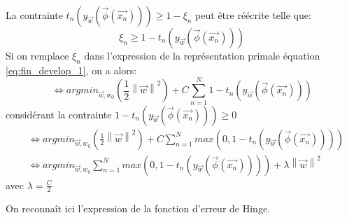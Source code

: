 La contrainte $t_n\left(y_{\overrightarrow{w}}(\overrightarrow{\phi}(\overrightarrow{x_n}))\right) \geqslant 1 - \xi_n$ peut être réécrite telle que:
$$
\xi_n \geqslant 1 - t_n\left(y_{\overrightarrow{w}}(\overrightarrow{\phi}(\overrightarrow{x_n}))\right)
$$
Si on remplace $\xi_n$ dans l'expression de la représentation primale équation \ref{eq:fin_develop_1}, on a alors:
\begin{equation}
	\iff argmin_{\overrightarrow{w}, w_0} \left(\frac{1}{2} \left\lVert\overrightarrow{w}\right\rVert^2 \right) + C \sum_{n=1}^N 1 - t_n\left(y_{\overrightarrow{w}}(\overrightarrow{\phi}(\overrightarrow{x_n}))\right)
\end{equation}
considérant la contrainte $1 - t_n\left(y_{\overrightarrow{w}}(\overrightarrow{\phi}(\overrightarrow{x_n}))\right) \geqslant 0$
\begin{equation}
\begin{split}
	&\iff argmin_{\overrightarrow{w}, w_0} \left(\frac{1}{2} \left\lVert\overrightarrow{w}\right\rVert^2 \right) + C \sum_{n=1}^N max\left(0, 1 - t_n\left(y_{\overrightarrow{w}}(\overrightarrow{\phi}(\overrightarrow{x_n}))\right)\right) \\
	&\iff argmin_{\overrightarrow{w}, w_0} \sum_{n=1}^N max\left(0, 1 - t_n\left(y_{\overrightarrow{w}}(\overrightarrow{\phi}(\overrightarrow{x_n}))\right)\right) + \lambda  \left\lVert\overrightarrow{w}\right\rVert^2
\end{split}
\end{equation}
avec $\lambda = \frac{C}{2}$

On reconnaît ici l'expression de la fonction d'erreur de Hinge.


